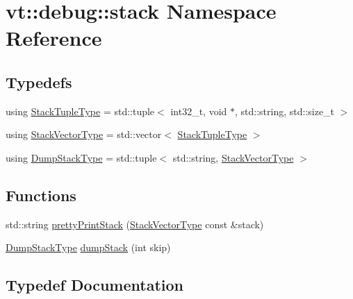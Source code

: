 \hypertarget{namespacevt_1_1debug_1_1stack}{}\section{vt\+:\+:debug\+:\+:stack Namespace Reference}
\label{namespacevt_1_1debug_1_1stack}
\subsection*{Typedefs}
\begin{DoxyCompactItemize}
\item 
using \hyperlink{namespacevt_1_1debug_1_1stack_afc0b70e5a3c0f073815eed49a09cebba}{Stack\+Tuple\+Type} = std\+::tuple$<$ int32\+\_\+t, void $\ast$, std\+::string, std\+::size\+\_\+t $>$
\item 
using \hyperlink{namespacevt_1_1debug_1_1stack_a29a3bbd4c51f20720ef437f124de9b62}{Stack\+Vector\+Type} = std\+::vector$<$ \hyperlink{namespacevt_1_1debug_1_1stack_afc0b70e5a3c0f073815eed49a09cebba}{Stack\+Tuple\+Type} $>$
\item 
using \hyperlink{namespacevt_1_1debug_1_1stack_a68d963f7e74664a123681e231d7913d9}{Dump\+Stack\+Type} = std\+::tuple$<$ std\+::string, \hyperlink{namespacevt_1_1debug_1_1stack_a29a3bbd4c51f20720ef437f124de9b62}{Stack\+Vector\+Type} $>$
\end{DoxyCompactItemize}
\subsection*{Functions}
\begin{DoxyCompactItemize}
\item 
std\+::string \hyperlink{namespacevt_1_1debug_1_1stack_a6c32eaeca4f5c8da5af1451d77031b3e}{pretty\+Print\+Stack} (\hyperlink{namespacevt_1_1debug_1_1stack_a29a3bbd4c51f20720ef437f124de9b62}{Stack\+Vector\+Type} const \&stack)
\item 
\hyperlink{namespacevt_1_1debug_1_1stack_a68d963f7e74664a123681e231d7913d9}{Dump\+Stack\+Type} \hyperlink{namespacevt_1_1debug_1_1stack_a89827f4a5411b18eb8fd0ea41d7b869d}{dump\+Stack} (int skip)
\end{DoxyCompactItemize}


\subsection{Typedef Documentation}
\mbox{\label{namespacevt_1_1debug_1_1stack_a68d963f7e74664a123681e231d7913d9}} 
